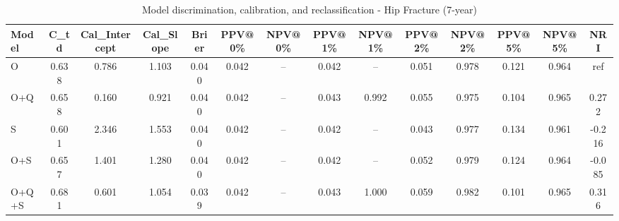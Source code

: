 \begin{table}[htbp]
\centering
\small
\caption{Model discrimination, calibration, and reclassification - Hip Fracture (7-year)}
\label{tab:perf_pd_7y}
\begin{tabular}{lccccccccccccc}
\toprule
Model & C\_td & Cal\_Intercept & Cal\_Slope & Brier & PPV@0\% & NPV@0\% & PPV@1\% & NPV@1\% & PPV@2\% & NPV@2\% & PPV@5\% & NPV@5\% & NRI \\
\midrule
O & 0.638 & 0.786 & 1.103 & 0.040 & 0.042 & -- & 0.042 & -- & 0.051 & 0.978 & 0.121 & 0.964 & ref \\
O+Q & 0.658 & 0.160 & 0.921 & 0.040 & 0.042 & -- & 0.043 & 0.992 & 0.055 & 0.975 & 0.104 & 0.965 & 0.272 \\
S & 0.601 & 2.346 & 1.553 & 0.040 & 0.042 & -- & 0.042 & -- & 0.043 & 0.977 & 0.134 & 0.961 & -0.216 \\
O+S & 0.657 & 1.401 & 1.280 & 0.040 & 0.042 & -- & 0.042 & -- & 0.052 & 0.979 & 0.124 & 0.964 & -0.085 \\
O+Q+S & 0.681 & 0.601 & 1.054 & 0.039 & 0.042 & -- & 0.043 & 1.000 & 0.059 & 0.982 & 0.101 & 0.965 & 0.316 \\
\bottomrule
\end{tabular}
\end{table}